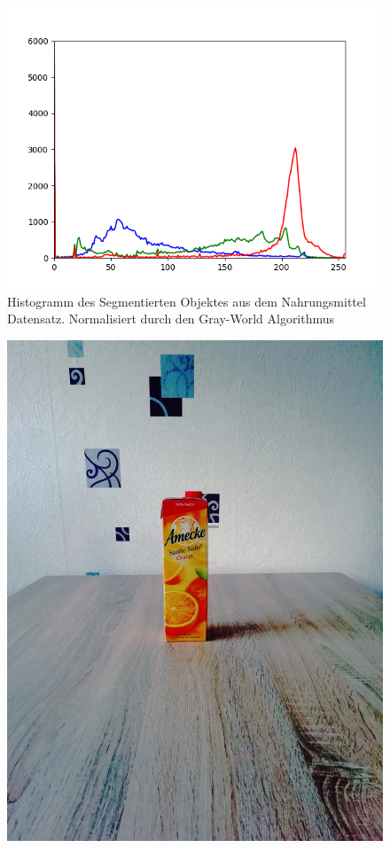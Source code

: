 \begin{appendices}
\begin{figure}[htb]
\begin{minipage}[c]{0.08\textwidth}
\end{minipage}
\hfill
\begin{minipage}[c]{0.3\textwidth}
\includegraphics[width=\textwidth]{Sources/Bild3_GW_histo.png}
\end{minipage}
\caption{Histogramm des Segmentierten Objektes aus dem Nahrungsmittel Datensatz. Normalisiert durch den Gray-World Algorithmus}
\label{img:evalGW}
\end{figure}
\newpage
\begin{figure}[htb]
\begin{minipage}[c]{0.2\textwidth}
\includegraphics[width=\textwidth]{Sources/Bild1_HS.jpg}

\end{minipage}
\end{figure}
\end{appendices}
